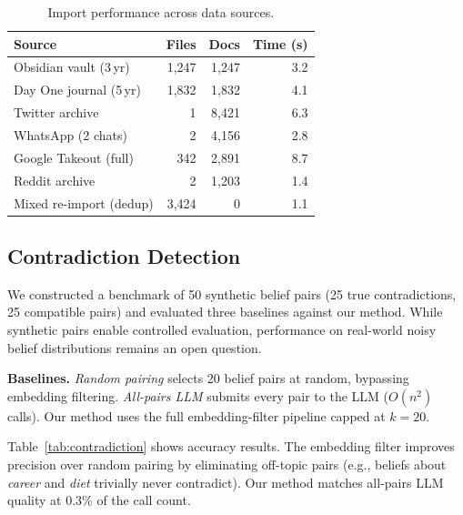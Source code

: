 \documentclass[conference]{IEEEtran}
\begin{document}
\begin{table}[t]
\caption{Import performance across data sources.}
\label{tab:import-perf}
\footnotesize
\begin{tabular}{lrrr}
\toprule
\textbf{Source} & \textbf{Files} & \textbf{Docs} & \textbf{Time (s)} \\
\midrule
Obsidian vault (3\,yr)    & 1,247 & 1,247 & 3.2 \\
Day One journal (5\,yr)   & 1,832 & 1,832 & 4.1 \\
Twitter archive            & 1     & 8,421 & 6.3 \\
WhatsApp (2 chats)         & 2     & 4,156 & 2.8 \\
Google Takeout (full)      & 342   & 2,891 & 8.7 \\
Reddit archive             & 2     & 1,203 & 1.4 \\
Mixed re-import (dedup)    & 3,424 & 0     & 1.1 \\
\bottomrule
\end{tabular}
\end{table}

\subsection{Contradiction Detection}

We constructed a benchmark of 50 synthetic belief pairs (25 true contradictions, 25 compatible pairs) and evaluated three baselines against our method. While synthetic pairs enable controlled evaluation, performance on real-world noisy belief distributions remains an open question.

\textbf{Baselines.} \emph{Random pairing} selects 20 belief pairs at random, bypassing embedding filtering. \emph{All-pairs LLM} submits every pair to the LLM ($O(n^2)$ calls). Our method uses the full embedding-filter pipeline capped at $k{=}20$.

Table~\ref{tab:contradiction} shows accuracy results. The embedding filter improves precision over random pairing by eliminating off-topic pairs (e.g., beliefs about \emph{career} and \emph{diet} trivially never contradict). Our method matches all-pairs LLM quality at 0.3\% of the call count.
\end{document}
